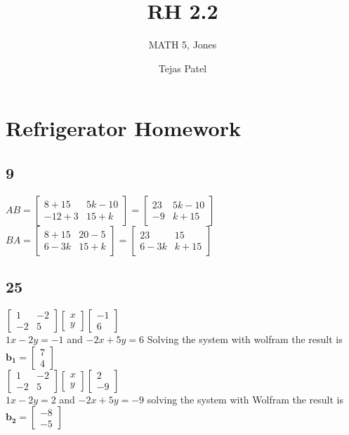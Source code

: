 \documentclass{article}
\title{RH 2.2}
\author{MATH 5, Jones}
\date{Tejas Patel}
\begin{document}
\maketitle
\section*{Refrigerator Homework}
\subsection*{9}
$AB=\begin{bmatrix}
  8+15 & 5k-10 \\ -12+3 & 15+k
\end{bmatrix}= \begin{bmatrix} 23 & 5k - 10 \\ -9 & k + 15 \end{bmatrix}$
\\[0.1in]$BA = \begin{bmatrix}8+15 & 20-5 \\ 6-3k & 15+k \end{bmatrix} = \begin{bmatrix} 23 & 15 \\ 6 - 3k & k + 15 \end{bmatrix}$
\\ 
\subsection*{25}
$\begin{bmatrix} 1 & -2 \\ -2 & 5 \end{bmatrix}\begin{bmatrix} x \\ y \end{bmatrix}\begin{bmatrix} -1 \\ 6 \end{bmatrix}$
\\[0.1in]$ 1x - 2y = -1 $ and $ -2x + 5y = 6 $ Solving the system with wolfram the result is $\mathbf{b_1} = \begin{bmatrix} 7 \\ 4 \end{bmatrix}$
\\$\begin{bmatrix} 1 & -2 \\ -2 & 5 \end{bmatrix}\begin{bmatrix} x \\ y \end{bmatrix}\begin{bmatrix} 2 \\ -9 \end{bmatrix}$
\\[0.1in]$ 1x - 2y = 2 $ and $-2x + 5y = -9 $ solving the system with Wolfram the result is $\mathbf{b_2} = \begin{bmatrix} -8 \\ -5 \end{bmatrix}$
\end{document}
